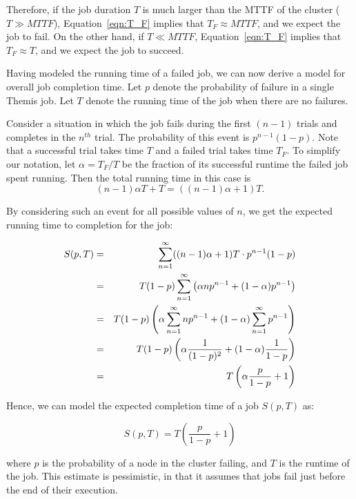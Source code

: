 Therefore, if the job duration $T$ is much larger than the MTTF of the cluster
($T \gg MTTF$), Equation~\ref{eqn:T_F} implies that $T_F \approx MTTF$, and we
expect the job to fail. On the other hand, if $T \ll MTTF$,
Equation~\ref{eqn:T_F} implies that $T_F \approx T$, and we expect the job to
succeed.

Having modeled the running time of a failed job, we can now derive a model for
overall job completion time. Let $p$ denote the probability of failure in a
single Themis job.  Let $T$ denote the running time of the job when there are
no failures.

Consider a situation in which the job fails during the first $(n-1)$ trials and
completes in the $n^{th}$ trial. The probability of this event is $p^{n-1} (1 -
p)$.  Note that a successful trial takes time $T$ and a failed trial takes time
$T_F$.  To simplify our notation, let $\alpha = T_F / T$ be the fraction of its
successful runtime the failed job spent running.  Then the total running time
in this case is
\[(n-1) \alpha T + T = ((n-1) \alpha + 1) T.\]

By considering such an event for all possible values of $n$, we get the
expected running time to completion for the job:

\vspace{-4mm}

\begin{eqnarray}
   S(p, T) &=& \sum_{n=1}^{\infty} ((n-1) \alpha + 1) T \cdot p^{n-1}(1-p)  \notag \\
           &=& T(1-p) \sum_{n=1}^{\infty} \left(\alpha n p^{n-1} + (1-\alpha) p^{n-1}\right)  \notag \\
           &=& T(1-p) \left(\alpha \sum_{n=1}^{\infty} n p^{n-1} + (1 - \alpha) \sum_{n=1}^{\infty} p^{n-1}\right) \notag \\
           &=& T(1-p) \left(\alpha \frac{1}{(1-p)^2} + (1 - \alpha) \frac{1}{1-p}\right) \notag \\
           &=& T \left(\alpha \frac{p}{1-p} + 1\right)
\label{eqn:job}
\end{eqnarray}

Hence, we can model the expected completion time of a job $S(p,T)$ as:

\begin{equation}
S(p,T) = T\left(\frac{p}{1 - p} + 1\right)
\label{eqn:expectedjobtime}
\end{equation}

where $p$ is the probability of a node in the cluster failing, and $T$ is the
runtime of the job.  This estimate is pessimistic, in that it assumes that jobs
fail just before the end of their execution.

